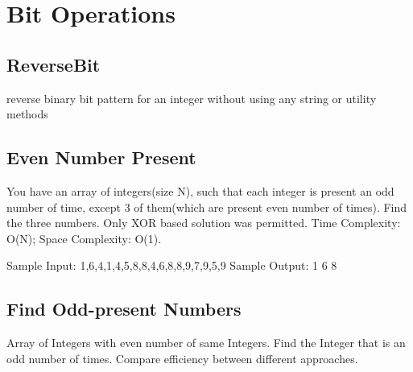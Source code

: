 \chapter{Bit Operations}

\section{ReverseBit}
reverse binary bit pattern for an integer without using any string or utility methods

\section{Even Number Present}
You have an array of integers(size N), such that each integer is present an odd number of time, except 3 of them(which are present even number of times). Find the three numbers. Only XOR based solution was permitted.
Time Complexity: O(N);
Space Complexity: O(1).

Sample Input:
{1,6,4,1,4,5,8,8,4,6,8,8,9,7,9,5,9}
Sample Output:
1 6 8

\section{Find Odd-present Numbers}
Array of Integers with even number of same Integers. Find the Integer that is an odd number of times. Compare efficiency between different approaches.
